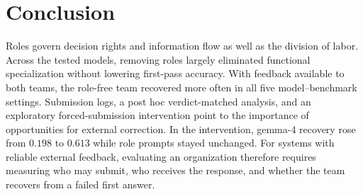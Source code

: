 \section{Conclusion}
\label{sec:conclusion}

Roles govern decision rights and information flow as well as the division
of labor. Across the tested models, removing roles largely eliminated
functional specialization without lowering first-pass accuracy. With
feedback available to both teams, the role-free team recovered more often
in all five model--benchmark settings. Submission logs, a post hoc
verdict-matched analysis, and an exploratory forced-submission intervention
point to the importance of opportunities for external correction. In the
intervention, gemma-4 recovery rose from $0.198$ to $0.613$ while role prompts
stayed unchanged. For systems with reliable external feedback, evaluating
an organization therefore requires measuring who may submit, who receives
the response, and whether the team recovers from a failed first answer.
